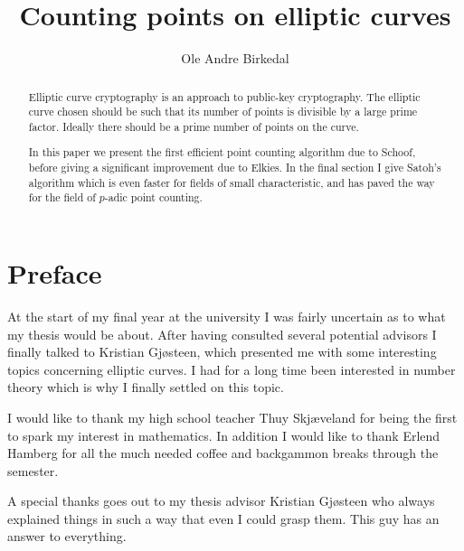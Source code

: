 \documentclass[a4paper,11pt,latin1]{amsart}
\title{Counting points on elliptic curves}
\author{Ole Andre Birkedal}
\begin{document}
\newtheorem{thm}{Theorem}
\newtheorem{mydef}{Definition}
\newtheorem{ex}{Example}
\newtheorem{prop}{Proposition}
\newtheorem{lemma}{Lemma}
\newtheorem{cor}{Corollary}

\begin{abstract}
Elliptic curve cryptography is an approach to public-key cryptography.
The elliptic curve chosen should be such that its number of points is divisible by
a large prime factor. Ideally there should be a prime number of points on the curve.

In this paper we present the first efficient point counting algorithm due to Schoof,
before giving a significant improvement due to Elkies. In the final section I give Satoh's
algorithm which is even faster for fields of small
characteristic, and has paved the way for the field of $p$-adic point counting.
\end{abstract}

\maketitle
\newpage
\section*{Preface}
At the start of my final year at the university I was fairly uncertain as to what my thesis would
be about. After having consulted several potential advisors I finally talked to Kristian Gj\o steen,
which presented me with some interesting topics concerning elliptic curves.
I had for a long time been interested in number theory which is why I finally settled on this topic.

I would like to thank my high school teacher Thuy Skj\ae veland for being the first to spark
my interest in mathematics. In addition I would like to thank Erlend Hamberg for all the
much needed coffee and backgammon breaks through the semester.

A special thanks goes out to my thesis advisor Kristian Gj\o steen who always explained
things in such a way that even I could grasp them. This guy has an answer to everything.
\newpage
\tableofcontents












\nocite{*}
\end{document}
